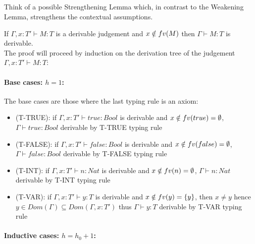 \subsection{}

Think of a possible Strengthening Lemma which, in contrast to the Weakening
Lemma, strengthens the contextual assumptions.

If $\Gamma, x: T' \vdash M: T$ is a derivable judgement and $x \notin fv(M)$ then
$\Gamma \vdash M: T$ is derivable.\\
The proof will proceed by induction on the derivation tree of the judgement
$\Gamma, x: T' \vdash M: T$:

\paragraph*{Base cases: $h = 1$:\\}

The base cases are those where the last typing rule is an axiom:
\begin{itemize}
	\item (T-TRUE):
	      if $\Gamma, x: T' \vdash true: Bool$ is derivable and
	      $x \notin fv(true) = \emptyset$, $\Gamma \vdash true: Bool$ derivable by T-TRUE typing rule
	\item (T-FALSE):
	      if $\Gamma, x: T' \vdash false: Bool$ is derivable and
	      $x \notin fv(false) = \emptyset$, $\Gamma \vdash false: Bool$ derivable by T-FALSE typing rule
	\item (T-INT):
	      if $\Gamma, x: T' \vdash n: Nat$ is derivable and
	      $x \notin fv(n) = \emptyset$, $\Gamma \vdash n: Nat$ derivable by T-INT typing rule
	\item (T-VAR):
	      if $\Gamma, x: T' \vdash y: T$ is derivable and
	      $x \notin fv(y) = \{y\}$, then $x \ne y$ hence
	      $y \in Dom(\Gamma) \subseteq Dom(\Gamma, x: T')$ thus $\Gamma \vdash y: T$ derivable by
	      T-VAR typing rule
\end{itemize}

\paragraph*{Inductive cases: $h = h_0 + 1$:\\}

